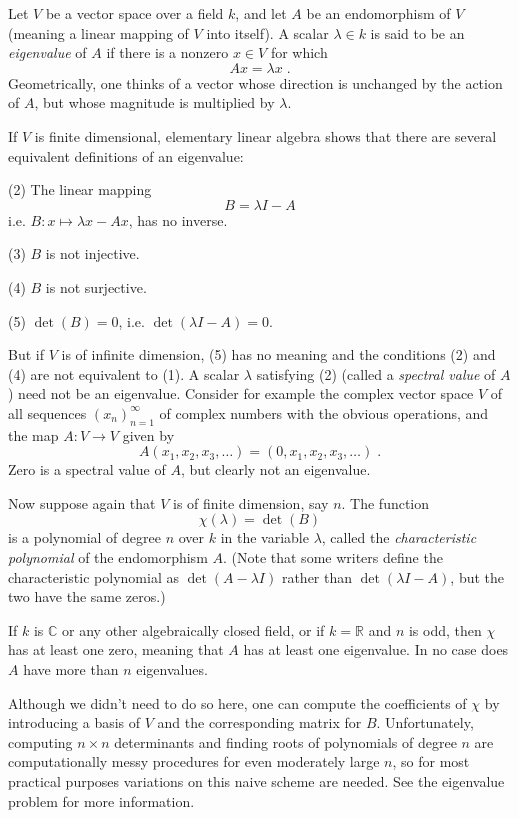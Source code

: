 \documentclass{article}
\begin{document}
\newcommand{\Z}{\mathbb{Z}}
\newcommand{\R}{\mathbb{R}}
\newcommand{\C}{\mathbb{C}}
Let $V$ be a vector space over a field $k$, and let $A$ be an
endomorphism of $V$ (meaning a linear mapping of $V$ into itself).
A scalar $\lambda\in k$ is said to be an
\emph{eigenvalue} of $A$ if there is a nonzero $x \in V$ for which
\begin{equation}
Ax = \lambda x\;.
\end{equation}
Geometrically, one thinks of a vector whose direction is unchanged
by the action of $A$, but whose magnitude is multiplied by $\lambda$.

If $V$ is finite dimensional, elementary linear algebra shows that
there are several equivalent definitions of an eigenvalue:

\noindent
(2) The linear mapping $$B=\lambda I - A$$
i.e. $B:x\mapsto \lambda x-Ax$, has no inverse.

\noindent
(3) $B$ is not injective.

\noindent
(4) $B$ is not surjective.

\noindent
(5) $\det(B)=0$, i.e. $\det(\lambda I-A)=0$.

But if $V$ is of infinite dimension, (5) has no meaning and the
conditions (2) and (4) are not equivalent to (1).
A scalar $\lambda$ satisfying (2) (called a \emph{spectral value} of
$A$) need not be an eigenvalue. Consider for example the complex
vector space $V$ of all sequences $(x_n)_{n=1}^{\infty}$ of complex
numbers with the obvious operations, and the map $A: V \to V$ given by
$$ A(x_1, x_2, x_3, \dots) = (0, x_1, x_2, x_3, \dots) \;. $$
Zero is a spectral value of $A$, but clearly not an eigenvalue.

Now suppose again that $V$ is of finite dimension, say $n$.
The function $$\chi(\lambda)=\det(B)$$
is a polynomial of degree $n$ over $k$ in the
variable $\lambda$, called the \emph{characteristic polynomial} of the
endomorphism $A$. (Note that some writers define the characteristic
polynomial as $\det(A-\lambda I)$ rather than $\det(\lambda I-A)$, but the
two have the same zeros.)

If $k$ is $\C$ or any other algebraically closed field, or if $k=\R$
and $n$ is odd, then $\chi$ has at least one zero, meaning that $A$
has at least one eigenvalue. In no case does $A$ have more than $n$
eigenvalues.

Although we didn't need to do so here, one can compute the coefficients
of $\chi$ by introducing a basis of $V$ and the corresponding matrix for
$B$. Unfortunately, computing $n \times n$ determinants and finding roots
of polynomials of degree $n$ are computationally messy procedures
for even moderately large $n$, so for most practical purposes
variations on this naive scheme are needed.  See the eigenvalue
problem for more information.
\end{document}
